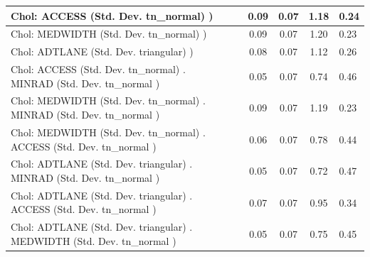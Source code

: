 \begin{table}
\begin{center}
\begin{tabular}{|l|l|c|c|c|l|}
			\hline
			 Chol: ACCESS (Std. Dev. tn_normal) ) &  & 0.09 & 0.07 & 1.18 & 0.24 \\
			\hline
			 Chol: MEDWIDTH (Std. Dev. tn_normal) ) &  & 0.09 & 0.07 & 1.20 & 0.23 \\
			\hline
			 Chol: ADTLANE (Std. Dev. triangular) ) &  & 0.08 & 0.07 & 1.12 & 0.26 \\
			\hline
			 Chol: ACCESS (Std. Dev. tn_normal) . MINRAD (Std. Dev.   tn_normal ) &  & 0.05 & 0.07 & 0.74 & 0.46 \\
			\hline
			 Chol: MEDWIDTH (Std. Dev. tn_normal) . MINRAD (Std. Dev.   tn_normal ) &  & 0.09 & 0.07 & 1.19 & 0.23 \\
			\hline
			 Chol: MEDWIDTH (Std. Dev. tn_normal) . ACCESS (Std. Dev.   tn_normal ) &  & 0.06 & 0.07 & 0.78 & 0.44 \\
			\hline
			 Chol: ADTLANE (Std. Dev. triangular) . MINRAD (Std. Dev.   tn_normal ) &  & 0.05 & 0.07 & 0.72 & 0.47 \\
			\hline
			 Chol: ADTLANE (Std. Dev. triangular) . ACCESS (Std. Dev.   tn_normal ) &  & 0.07 & 0.07 & 0.95 & 0.34 \\
			\hline
			 Chol: ADTLANE (Std. Dev. triangular) . MEDWIDTH (Std. Dev.   tn_normal ) &  & 0.05 & 0.07 & 0.75 & 0.45 \\
			\hline
		\end{tabular}
	\end{center}
\end{table}